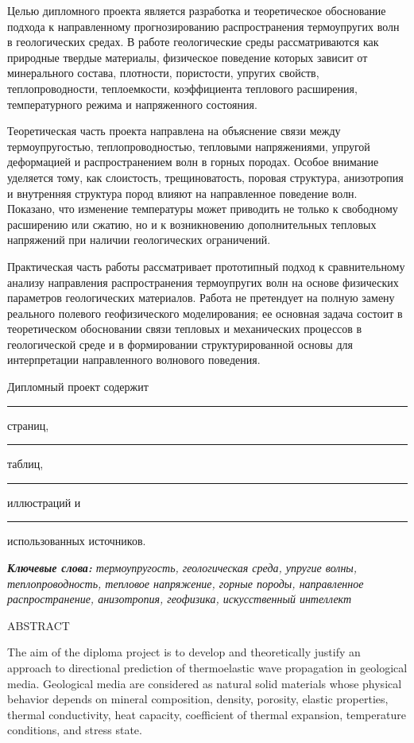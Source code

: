Целью дипломного проекта является разработка и теоретическое обоснование подхода к направленному прогнозированию распространения термоупругих волн в геологических средах. В работе геологические среды рассматриваются как природные твердые материалы, физическое поведение которых зависит от минерального состава, плотности, пористости, упругих свойств, теплопроводности, теплоемкости, коэффициента теплового расширения, температурного режима и напряженного состояния.

Теоретическая часть проекта направлена на объяснение связи между термоупругостью, теплопроводностью, тепловыми напряжениями, упругой деформацией и распространением волн в горных породах. Особое внимание уделяется тому, как слоистость, трещиноватость, поровая структура, анизотропия и внутренняя структура пород влияют на направленное поведение волн. Показано, что изменение температуры может приводить не только к свободному расширению или сжатию, но и к возникновению дополнительных тепловых напряжений при наличии геологических ограничений.

Практическая часть работы рассматривает прототипный подход к сравнительному анализу направления распространения термоупругих волн на основе физических параметров геологических материалов. Работа не претендует на полную замену реального полевого геофизического моделирования; ее основная задача состоит в теоретическом обосновании связи тепловых и механических процессов в геологической среде и в формировании структурированной основы для интерпретации направленного волнового поведения.

Дипломный проект содержит \rule{1cm}{0.1pt} страниц, \rule{1cm}{0.1pt} таблиц, \rule{1cm}{0.1pt} иллюстраций и \rule{1cm}{0.1pt} использованных источников.

\vspace{5mm}
\noindent\textit{\textbf{Ключевые слова:} термоупругость, геологическая среда, упругие волны, теплопроводность, тепловое напряжение, горные породы, направленное распространение, анизотропия, геофизика, искусственный интеллект}

\clearpage
\thispagestyle{empty}

\begin{center}
{\Large ABSTRACT}
\end{center}

The aim of the diploma project is to develop and theoretically justify an approach to directional prediction of thermoelastic wave propagation in geological media. Geological media are considered as natural solid materials whose physical behavior depends on mineral composition, density, porosity, elastic properties, thermal conductivity, heat capacity, coefficient of thermal expansion, temperature conditions, and stress state.

